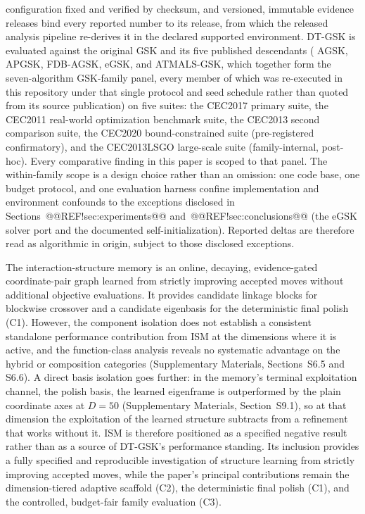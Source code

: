 \documentclass[10pt,a4paper]{article}
\newcommand{\dtgsk}{DT-GSK}
\newcommand{\atmals}{ATMALS-GSK}
\newcommand{\agsk}{AGSK}
\newcommand{\apgsk}{APGSK}
\newcommand{\fdbagsk}{FDB-AGSK}
\newcommand{\egsk}{eGSK}
\begin{document}
\begin{itemize}[leftmargin=*,labelsep=4.9mm]
  configuration fixed and verified by checksum, and versioned, immutable
  evidence releases
  bind every reported number to its release, from which the released
  analysis pipeline re-derives it in the declared supported environment. \dtgsk{} is evaluated
  against the original GSK and its five published descendants (
  \agsk{}, \apgsk{}, \fdbagsk{}, \egsk{}, and \atmals{}, which together
  form the seven-algorithm GSK-family panel, every member of which was re-executed
  in this repository under that single protocol and seed schedule rather
  than quoted from its source publication) on five suites: the CEC2017
  primary suite, the CEC2011 real-world optimization benchmark suite, the
  CEC2013 second comparison suite, the CEC2020 bound-constrained suite
  (pre-registered confirmatory), and the CEC2013LSGO large-scale suite
  (family-internal, post-hoc). Every comparative finding in this paper is scoped to that
  panel. The within-family scope is a design choice rather than an
  omission: one code base, one budget protocol, and one evaluation
  harness confine implementation and environment confounds to the
  exceptions disclosed in Sections~@@REF!sec:experiments@@
  and~@@REF!sec:conclusions@@ (the \egsk{} solver port and the documented
  self-initialization). Reported deltas are therefore read as algorithmic
  in origin, subject to those disclosed exceptions. 
\end{itemize}

The interaction-structure memory is an online, decaying, evidence-gated coordinate-pair graph learned from strictly improving accepted moves without additional objective evaluations. It provides candidate linkage blocks for blockwise crossover and a candidate eigenbasis for the deterministic final polish (C1). However, the component isolation does not establish a consistent standalone performance contribution from ISM at the dimensions where it is active, and the function-class analysis reveals no systematic advantage on the hybrid or composition categories (Supplementary Materials, Sections~S6.5 and S6.6). A direct basis isolation goes further: in the memory's terminal exploitation channel, the polish basis, the learned eigenframe is outperformed by the plain coordinate axes at $D = 50$ (Supplementary Materials, Section~S9.1), so at that dimension the exploitation of the learned structure subtracts from a refinement that works without it. ISM is therefore positioned as a specified negative result rather than as a source of \dtgsk{}'s performance standing. Its inclusion provides a fully specified and reproducible investigation of structure learning from strictly improving accepted moves, while the paper's principal contributions remain the dimension-tiered adaptive scaffold (C2), the deterministic final polish (C1), and the controlled, budget-fair family evaluation (C3).
\end{document}
